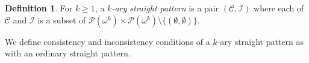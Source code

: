 \documentclass{article}
\newcommand{\calP}{\mathcal{P}}
\newcommand{\calC}{\mathcal{C}}
\newcommand{\calI}{\mathcal{I}}
\theoremstyle{definition}
\newtheorem{definition}{Definition}
\theoremstyle{definition}
\theoremstyle{definition}
\begin{document}



\begin{definition}\label{k-ary straight pattern}
    For $k\geq 1$, a $k$\textit{-ary straight pattern} is a pair $(\calC, \calI)$ where each of $\calC$ and $\calI$ is a subset of $\calP(\omega^{k})\times\calP(\omega^k)\setminus\{(\emptyset,\emptyset)\}$.

    We define consistency and inconsistency conditions of a $k$-ary straight pattern as with an ordinary straight pattern.
    
\end{definition}
\end{document}

